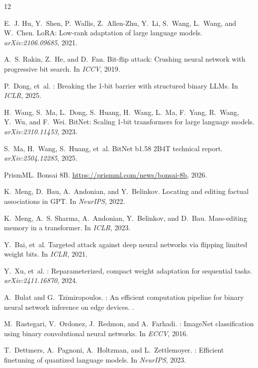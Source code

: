 \documentclass[11pt,a4paper]{article}
\begin{document}

\begin{thebibliography}{12}

E.~J. Hu, Y.~Shen, P.~Wallis, Z.~Allen-Zhu, Y.~Li, S.~Wang, L.~Wang,
  and W.~Chen.
\newblock Lo{RA}: Low-rank adaptation of large language models.
\newblock \emph{arXiv:2106.09685}, 2021.

A.~S. Rakin, Z.~He, and D.~Fan.
\newblock Bit-flip attack: Crushing neural network with progressive bit
  search.
\newblock In \emph{ICCV}, 2019.

P.~Dong, et~al.
: Breaking the 1-bit barrier with structured binary
  {LLMs}.
\newblock In \emph{ICLR}, 2025.

H.~Wang, S.~Ma, L.~Dong, S.~Huang, H.~Wang, L.~Ma, F.~Yang, R.~Wang,
  Y.~Wu, and F.~Wei.
\newblock Bit{N}et: Scaling 1-bit transformers for large language models.
\newblock \emph{arXiv:2310.11453}, 2023.

S.~Ma, H.~Wang, S.~Huang, et~al.
\newblock Bit{N}et b1.58 2{B}4{T} technical report.
\newblock \emph{arXiv:2504.12285}, 2025.

{PrismML}.
\newblock Bonsai 8{B}.
\newblock \url{https://prismml.com/news/bonsai-8b}, 2026.

K.~Meng, D.~Bau, A.~Andonian, and Y.~Belinkov.
\newblock Locating and editing factual associations in {GPT}.
\newblock In \emph{NeurIPS}, 2022.

K.~Meng, A.~S. Sharma, A.~Andonian, Y.~Belinkov, and D.~Bau.
\newblock Mass-editing memory in a transformer.
\newblock In \emph{ICLR}, 2023.

Y.~Bai, et~al.
\newblock Targeted attack against deep neural networks via flipping limited
  weight bits.
\newblock In \emph{ICLR}, 2021.

Y.~Xu, et~al.
: Reparameterized, compact weight adaptation for
  sequential tasks.
\newblock \emph{arXiv:2411.16870}, 2024.

A.~Bulat and G.~Tzimiropoulos.
: An efficient computation pipeline for binary neural
  network inference on edge devices.
.

M.~Rastegari, V.~Ordonez, J.~Redmon, and A.~Farhadi.
: Image{N}et classification using binary convolutional
  neural networks.
\newblock In \emph{ECCV}, 2016.

T.~Dettmers, A.~Pagnoni, A.~Holtzman, and L.~Zettlemoyer.
: Efficient finetuning of quantized language models.
\newblock In \emph{NeurIPS}, 2023.

\end{thebibliography}
\end{document}
